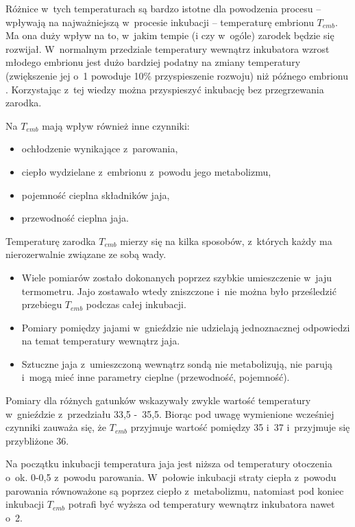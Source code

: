 Różnice w~tych temperaturach są bardzo istotne dla powodzenia procesu --
wpływają na najważniejszą w~procesie inkubacji -- temperaturę embrionu $T_{emb}$.
Ma ona duży wpływ na to, w~jakim tempie (i czy w~ogóle) zarodek będzie się
rozwijał. W~normalnym przedziale temperatury wewnątrz inkubatora wzrost młodego
embrionu jest dużo bardziej podatny na zmiany temperatury (zwiększenie jej
o~1\st{}  powoduje 10\% przyspieszenie rozwoju) niż późnego
embrionu \cite{AA:Princ95}. Korzystając z~tej wiedzy można przyspieszyć inkubację
bez przegrzewania zarodka. 

Na $T_{emb}$ mają wpływ również inne czynniki: 
\begin{itemize}
	\item ochłodzenie wynikające z~parowania,
	\item ciepło wydzielane z~embrionu z~powodu jego metabolizmu,
	\item pojemność cieplna składników jaja,
	\item przewodność cieplna jaja.
\end{itemize}

Temperaturę zarodka $T_{emb}$ mierzy się na kilka sposobów, z~których każdy ma
nierozerwalnie związane ze sobą wady. 
\begin{itemize}
	\item Wiele pomiarów zostało dokonanych poprzez szybkie umieszczenie w~jaju
		termometru. Jajo zostawało wtedy zniszczone i~nie można było prześledzić
		przebiegu $T_{emb}$ podczas całej inkubacji.
	\item Pomiary pomiędzy jajami w~gnieździe nie udzielają jednoznacznej
		odpowiedzi na temat temperatury wewnątrz jaja.
	\item Sztuczne jaja z~umieszczoną wewnątrz sondą nie metabolizują, nie parują
		i~mogą mieć inne parametry cieplne (przewodność, pojemność).
\end{itemize}

Pomiary dla różnych gatunków wskazywały zwykle wartość temperatury w~gnieździe
z~przedziału 33,5\st{} -~35,5\st{}. Biorąc pod uwagę wymienione wcześniej czynniki
zauważa się, że $T_{emb}$ przyjmuje wartość pomiędzy 35\st{} i~37\st{}
i~przyjmuje się przybliżone 36\st{}.

Na początku inkubacji temperatura jaja jest niższa od temperatury otoczenia
o~ok. 0-0,5\st{} z~powodu parowania. W~połowie inkubacji straty ciepła z~powodu
parowania równoważone są poprzez ciepło z~metabolizmu, natomiast pod koniec
inkubacji $T_{emb}$ potrafi być wyższa od temperatury wewnątrz inkubatora nawet
o~2\st{}.

